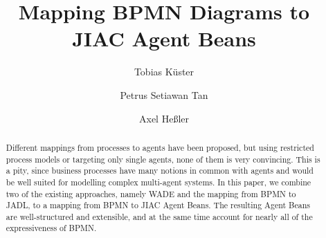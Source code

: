 \documentclass[a4paper]{article}
\title{Mapping BPMN Diagrams to JIAC Agent Beans}
\author{Tobias K\"uster \and Petrus Setiawan Tan \and Axel He\ss{}ler}
\date{}
\begin{document}
	\maketitle

	\begin{abstract}
		Different mappings from processes to agents have been proposed, but using
		restricted process models or targeting only single agents, none of them
		is very convincing.
		This is a pity, since business processes have many notions in common with
		agents and would be well suited for modelling complex multi-agent systems.
		In this paper, we combine two of the existing approaches, namely WADE and
		the mapping from BPMN to JADL, to a mapping from BPMN to JIAC Agent Beans.
		The resulting Agent Beans are well-structured and extensible, and at the
		same time account for nearly all of the expressiveness of BPMN.
	\end{abstract}

	
	
	
	
	
	
	

	
\end{document}
